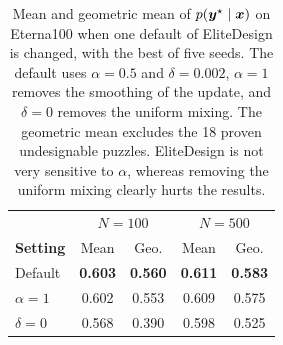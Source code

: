 \begin{table}[H]
\begin{minipage}[t]{0.635\textwidth}
\label{tab:supp-16s-native}
\end{minipage}\hfill
\begin{minipage}[t]{0.345\textwidth}
\centering\footnotesize
\renewcommand{\arraystretch}{1.15}
\setlength{\tabcolsep}{3pt}
\begin{tabular}{@{}l|cc|cc@{}}
\toprule
& \multicolumn{2}{c|}{$N{=}100$} & \multicolumn{2}{c}{$N{=}500$} \\
\textbf{Setting} & Mean & Geo. & Mean & Geo. \\
\midrule
Default & \textbf{0.603} & \textbf{0.560} & \textbf{0.611} & \textbf{0.583} \\
$\alpha=1$ & 0.602 & 0.553 & 0.609 & 0.575 \\
$\delta=0$ & 0.568 & 0.390 & 0.598 & 0.525 \\
\bottomrule
\end{tabular}
\caption{Mean and geometric mean of $p(\boldsymbol{{y}}^\star\mid\boldsymbol{{x}})$ on Eterna100 when one default of EliteDesign is changed, with the best of five seeds. The default uses $\alpha=0.5$ and $\delta=0.002$, $\alpha=1$ removes the smoothing of the update, and $\delta=0$ removes the uniform mixing. The geometric mean excludes the 18 proven undesignable puzzles. EliteDesign is not very sensitive to $\alpha$, whereas removing the uniform mixing clearly hurts the results.}
\label{tab:supp-settings}
\end{minipage}
\end{table}
